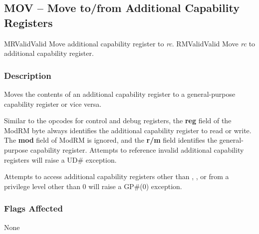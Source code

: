 \clearpage
{}
{}
\subsection*{MOV -- Move to/from Additional Capability Registers}

\begin{x86opcodetable}
  {MR}{Valid}{Valid}
  {Move additional capability register to \emph{rc}.}
  {RM}{Valid}{Valid}
  {Move \emph{rc} to additional capability register.}
\end{x86opcodetable}

\begin{x86opentable}
\end{x86opentable}

\subsubsection*{Description}

Moves the contents of an additional capability register to a
general-purpose capability register or vice versa.

Similar to the  opcodes for control and debug
registers, the \textbf{reg} field of the ModRM byte always identifies
the additional capability register to read or write.  The \textbf{mod}
field of ModRM is ignored, and the \textbf{r/m} field identifies the
general-purpose capability register.  Attempts to reference invalid
additional capability registers will raise a UD\# exception.

Attempts to access additional capability registers other than \CFS{},
\CGS{}, or \DDC{} from a privilege level other than 0 will raise a
GP\#(0) exception.

\subsubsection*{Flags Affected}

None
